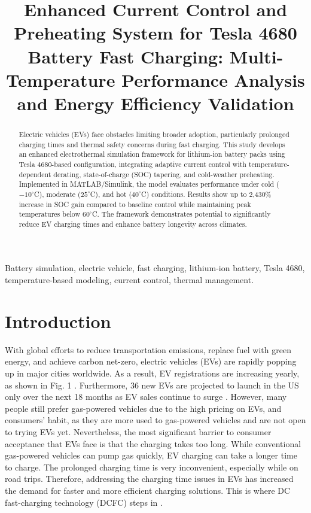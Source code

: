 \documentclass[conference]{IEEEtran}
\title{Enhanced Current Control and Preheating System for Tesla 4680 Battery Fast Charging: Multi-Temperature Performance Analysis and Energy Efficiency Validation}
\author{
    \IEEEauthorblockN{Thang Quoc Ly}
    \IEEEauthorblockA{
        Department of Physics\\
        Grinnell College\\
        Grinnell, Iowa, United States\\
        Email: lytimmy@grinnell.edu
    }
}
\begin{document}
\maketitle

\begin{abstract}

Electric vehicles (EVs) face obstacles limiting broader adoption, particularly prolonged charging times and thermal safety concerns during fast charging. This study develops an enhanced electrothermal simulation framework for lithium-ion battery packs using Tesla 4680-based configuration, integrating adaptive current control with temperature-dependent derating, state-of-charge (SOC) tapering, and cold-weather preheating. Implemented in MATLAB/Simulink, the model evaluates performance under cold ($-10^\circ$C), moderate ($25^\circ$C), and hot ($40^\circ$C) conditions. Results show up to 2,430\% increase in SOC gain compared to baseline control while maintaining peak temperatures below $60^\circ$C. The framework demonstrates potential to significantly reduce EV charging times and enhance battery longevity across climates.
\end{abstract}

\begin{IEEEkeywords}
Battery simulation, electric vehicle, fast charging, lithium-ion battery, Tesla 4680, temperature-based modeling, current control, thermal management.
\end{IEEEkeywords}

\section{\textbf{Introduction}}

 With global efforts to reduce transportation emissions, replace fuel with green energy, and achieve carbon net-zero, electric vehicles (EVs) are rapidly popping up in major cities worldwide. As a result, EV registrations are increasing yearly, as shown in Fig. 1 \cite{iea2025global}. Furthermore, 36 new EVs are projected to launch in the US only over the next 18 months as EV sales continue to surge \cite{jordhamo2025ev}. However, many people still prefer gas-powered vehicles due to the high pricing on EVs, and consumers' habit, as they are more used to gas-powered vehicles and are not open to trying EVs yet. Nevertheless, the most significant barrier to consumer acceptance that EVs face is that the charging takes too long. While conventional gas-powered vehicles can pump gas quickly, EV charging can take a longer time to charge. The prolonged charging time is very inconvenient, especially while on road trips. Therefore, addressing the charging time issues in EVs has increased the demand for faster and more efficient charging solutions. This is where DC fast-charging technology (DCFC) steps in \cite{threewitt2025reasons}.  
 
\end{document}
